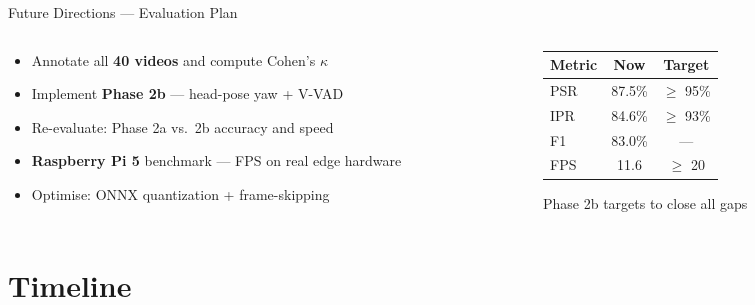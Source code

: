 \documentclass[aspectratio=169]{beamer}
\newcommand{\pending}{\textcolor{orange}{\ding{109}}}
\begin{document}
\begin{frame}{Future Directions — Evaluation Plan}
\begin{columns}[T]
\begin{column}{0.50\textwidth}
  \begin{itemize}\setlength{\itemsep}{0.4cm}
    \item[\pending] Annotate all \textbf{40 videos} and compute Cohen's $\kappa$
    \item[\pending] Implement \textbf{Phase 2b} — head-pose yaw + V-VAD
    \item[\pending] Re-evaluate: Phase 2a vs.\ 2b accuracy and speed
    \item[\pending] \textbf{Raspberry Pi 5} benchmark — FPS on real edge hardware
    \item[\pending] Optimise: ONNX quantization + frame-skipping
  \end{itemize}
\end{column}
\begin{column}{0.46\textwidth}
  \begin{table}
    \renewcommand{\arraystretch}{1.6}\small
    \begin{tabular}{lcc}
    \toprule
    \textbf{Metric} & \textbf{Now} & \textbf{Target} \\
    \midrule
    PSR  & 87.5\%  & $\geq$ 95\% \\
    IPR  & 84.6\%  & $\geq$ 93\% \\
    F1   & 83.0\%  & --- \\
    FPS  & 11.6    & $\geq$ 20 \\
    \bottomrule
    \end{tabular}
  \end{table}
  \vspace{0.2cm}
  \centering\small Phase 2b targets to close all gaps
\end{column}
\end{columns}
\end{frame}

\section{Timeline}

\end{document}
